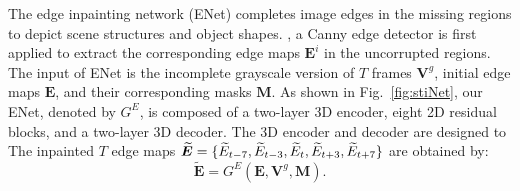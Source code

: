 The edge inpainting network (ENet) completes image edges in the missing regions to depict scene structures and object shapes.
, a Canny edge detector is first applied to extract the corresponding edge maps $\boldsymbol{E}^{i}$ in the uncorrupted regions. %
The input of ENet is  the incomplete grayscale version of $T$ frames $\boldsymbol{V}^{g}$, initial edge maps $\boldsymbol{E}$, and their corresponding masks $\boldsymbol{M}$.
%
As shown in Fig.~\ref{fig:stiNet}, our ENet, denoted by $G^E$, is composed of a two-layer 3D encoder, eight 2D residual blocks, and a two-layer 3D decoder. 
The 3D encoder and decoder are designed to 
The inpainted $T$ edge maps 	$\boldsymbol{\widetilde{E}}=\{\widetilde{E}_{t-7},\widetilde{E}_{t-3},\widetilde{E}_{t},\widetilde{E}_{t+3},\widetilde{E}_{t+7}\}$ are obtained by:
\begin{equation}
	\label{eq:edgenet}
	\boldsymbol{\widetilde{E}}=G^E(\boldsymbol{E},\boldsymbol{V}^{g},\boldsymbol{M}).
\end{equation}

